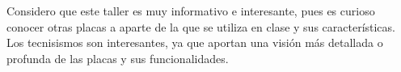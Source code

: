 Considero que este taller es muy informativo e interesante, pues es curioso conocer otras placas a aparte de la que se utiliza en clase y sus características. Los tecnisismos son interesantes, ya que aportan una visión más detallada o profunda de las placas y sus funcionalidades.